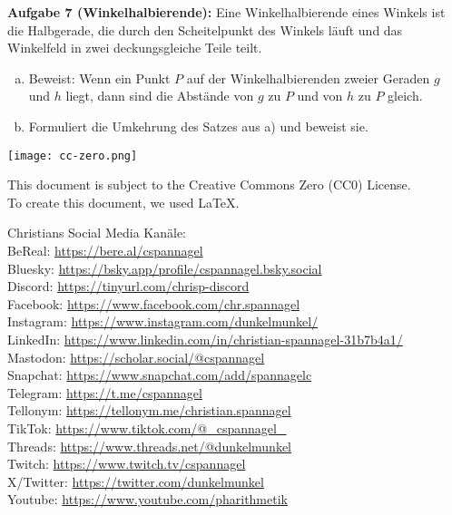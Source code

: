 \documentclass[12pt,a4paper,oneside,ngerman]{article}
\begin{document}
\textbf{Aufgabe 7 (Winkelhalbierende):} Eine Winkelhalbierende eines Winkels ist die Halbgerade, die durch den Scheitelpunkt des Winkels läuft und das Winkelfeld in zwei deckungsgleiche Teile teilt.

\begin{enumerate}[a)]
\item Beweist: Wenn ein Punkt $P$ auf der Winkelhalbierenden zweier Geraden $g$ und $h$ liegt, dann sind die Abstände von $g$ zu $P$ und von $h$ zu $P$ gleich.
\item Formuliert die Umkehrung des Satzes aus a) und beweist sie.
\end{enumerate}




\vspace*{10mm}
\texttt{[image: cc-zero.png]}

\tiny{This document is subject to the Creative Commons Zero (CC0) License.
\\ To create this document, we used \LaTeX{}.

Christians Social Media Kanäle:\\
BeReal: \url{https://bere.al/cspannagel}\\
Bluesky: \url{https://bsky.app/profile/cspannagel.bsky.social}\\
Discord: \url{https://tinyurl.com/chrisp-discord}\\
Facebook: \url{https://www.facebook.com/chr.spannagel}\\
Instagram: \url{https://www.instagram.com/dunkelmunkel/}\\
LinkedIn: \url{https://www.linkedin.com/in/christian-spannagel-31b7b4a1/}\\
Mastodon: \url{https://scholar.social/@cspannagel}\\
Snapchat: \url{https://www.snapchat.com/add/spannagelc}\\
Telegram: \url{https://t.me/cspannagel}\\
Tellonym: \url{https://tellonym.me/christian.spannagel}\\
TikTok: \url{https://www.tiktok.com/@_cspannagel_}\\
Threads: \url{https://www.threads.net/@dunkelmunkel}\\
Twitch: \url{https://www.twitch.tv/cspannagel}\\
X/Twitter: \url{https://twitter.com/dunkelmunkel}\\
Youtube: \url{https://www.youtube.com/pharithmetik}}\\


\end{document}
